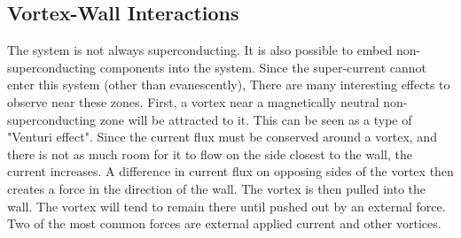 \subsection{Vortex-Wall Interactions}
The system is not always superconducting. It is also possible to embed non-superconducting components into the system. Since the super-current cannot enter this system (other than evanescently), There are many interesting effects to observe near these zones. First, a vortex near a magnetically neutral non-superconducting zone will be attracted to it. This can be seen as a type of "Venturi effect". Since the current flux must be conserved around a vortex, and there is not as much room for it to flow on the side closest to the wall, the current increases. A difference in current flux on opposing sides of the vortex then creates a force in the direction of the wall. The vortex is then pulled into the wall. The vortex will tend to remain there until pushed out by an external force. Two of the most common forces are external applied current and other vortices.
 
